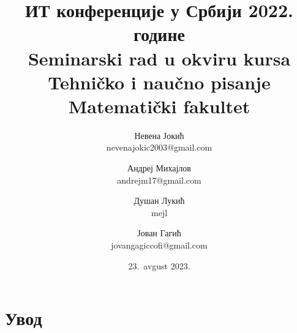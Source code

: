 \documentclass[12pt]{article}
\begin{document}
\title{ИТ конференције у Србији 2022. године\\ \small{Seminarski rad u okviru kursa\\Tehničko i naučno pisanje\\ Matematički fakultet}}
\author{Невена Јокић\\ nevenajokic2003@gmail.com \and Андреј Михајлов\\ andrejm17@gmail.com \and Душан Лукић\\ mejl \and Јован Гагић\\ jovangagiccofi@gmail.com}
\date{23.~avgust 2023.}
\maketitle
{}

\newpage

\tableofcontents
\newpage

\section{Увод}
\end{document}
